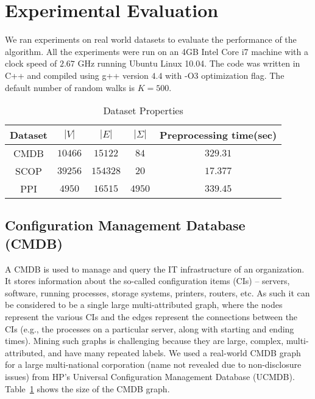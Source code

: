 \section{ Experimental Evaluation} 

We ran experiments on real world datasets to
evaluate the performance of the algorithm. All the experiments were run
on an 4GB Intel Core i7 machine with a clock speed of $2.67$ GHz running
Ubuntu Linux 10.04. The code was written in C++ and 
compiled using g++ version $4.4$ with -O3
optimization flag. The default number of random walks is $K=500$.

\begin{table}[!h]
  \centering
    \begin{tabular}{|c|c|c|c|c|}
      \hline
      Dataset & $|V|$ & $|E|$ & $|\Sigma|$ & \small{Preprocessing time(sec)} \\
      \hline
      CMDB & $10466$ & $15122$ & $84$ & $329.31$ \\
      SCOP & $39256$ & $154328$ & $20$ & $17.377$ \\
      PPI & $4950$ & $16515$ & $4950$ & $339.45 $\\
	  \hline
    \end{tabular}
    \caption{Dataset Properties}
	\label{tab:db}
\end{table}


\subsection{Configuration Management Database\\ (CMDB)} 

A CMDB is used to manage and query the IT infrastructure of an
organization. It stores information about the so-called configuration
items (CIs) -- servers, software, running processes, storage systems,
printers, routers, etc. As such it can be considered to be a single
large multi-attributed graph, where the nodes represent the various CIs
and the edges represent the connections between the CIs (e.g., the
processes on a particular server, along with starting and ending times).
Mining such graphs is challenging because they are large, complex,
multi-attributed, and have many repeated labels.  We used a real-world
CMDB graph for a large multi-national corporation (name not revealed due
to non-disclosure issues) from HP's Universal Configuration Management
Database (UCMDB).  Table~\ref{tab:db} shows the size of the CMDB graph. 


